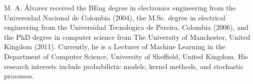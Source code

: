 \documentclass[journal]{IEEEtran}
\begin{document}
\begin{IEEEbiographynophoto}{M. A. Álvarez}
received the BEng degree in electronics engineering from the Universidad Nacional de Colombia (2004), the M.Sc. degree
in electrical engineering from the Universidad Tecnologica de Pereira, Colombia (2006), and the PhD degree in computer science from The University of Manchester, United Kingdom (2011). Currently, he is a Lecturer of Machine Learning in the Department of Computer Science, University of Sheffield, United Kingdom. His research interests include probabilistic models, kernel methods, and stochastic processes.
\end{IEEEbiographynophoto}













\end{document}
